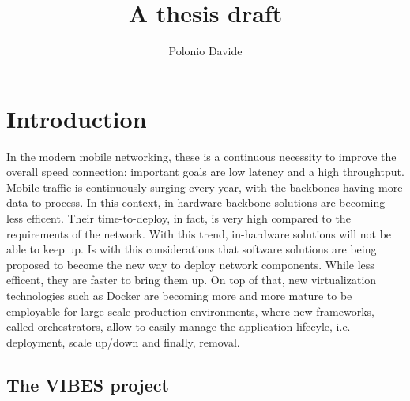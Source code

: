 \documentclass[10pt]{book}
\author{Polonio Davide}
\title{A thesis draft}
\begin{document}
 \maketitle
 

 
 \chapter{Introduction}
 
 In the modern mobile networking, these is a continuous necessity to 
improve the overall speed connection: important goals are low latency and a 
high throughtput. Mobile traffic is continuously surging every year, with 
the backbones having more data to process. In this context, in-hardware 
backbone solutions are becoming less efficent. Their time-to-deploy, in fact, is 
very high compared to the requirements of the network. With this trend, 
in-hardware solutions will not be able to keep up. Is with this considerations 
that software solutions are being proposed to become the new way to deploy 
network components. While less efficent, they are faster to bring them up. On 
top of that, new virtualization technologies such as Docker are becoming more 
and more mature to be employable for large-scale production environments, where 
new frameworks, called orchestrators, allow to easily manage the application 
lifecyle, i.e. deployment, scale up/down and finally, removal.
 
 \section{The VIBES project}
\end{document}
